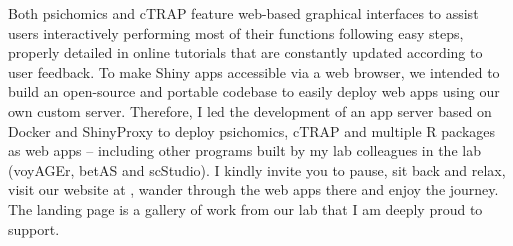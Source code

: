 Both psichomics and cTRAP feature web-based graphical interfaces to assist users interactively performing most of their functions following easy steps, properly detailed in online tutorials that are constantly updated according to user feedback. To make Shiny apps accessible via a web browser, we intended to build an open-source and portable codebase to easily deploy web apps using our own custom server. Therefore, I led the development of an app server based on Docker and ShinyProxy to deploy psichomics, cTRAP and multiple R packages as web apps -- including other programs built by my lab colleagues in the lab (voyAGEr, betAS and scStudio). I kindly invite you to pause, sit back and relax, visit our website at , wander through the web apps there and enjoy the journey. The landing page is a gallery of work from our lab that I am deeply proud to support.
